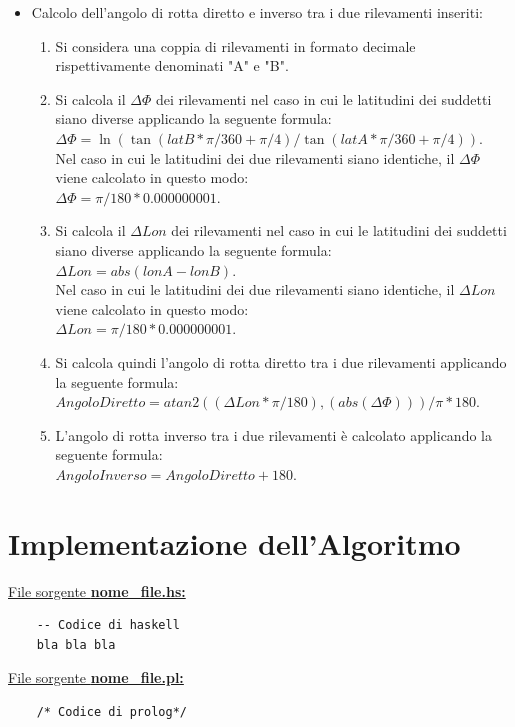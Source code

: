 \documentclass{article}
\begin{document}
\begin{itemize}
	\item  Calcolo dell'angolo di rotta diretto e inverso tra i due rilevamenti inseriti:
	\begin{enumerate}
		\item  Si considera una coppia di rilevamenti in formato decimale rispettivamente denominati "A" e "B".
		\item Si calcola il $\Delta\Phi$ dei rilevamenti nel caso in cui le latitudini dei suddetti siano diverse applicando la seguente formula:\\ $\Delta\Phi = \ln( \tan(latB * \pi / 360 + \pi / 4 ) / \tan(latA * \pi / 360 + \pi / 4 )). $\\
		Nel caso in cui le latitudini dei due rilevamenti siano identiche, il $\Delta\Phi$ viene calcolato in questo modo:\\ $\Delta\Phi = \pi / 180 * 0.000000001.$
		\item Si calcola il $\Delta Lon$ dei rilevamenti nel caso in cui le latitudini dei suddetti siano diverse applicando la seguente formula:\\ $ \Delta Lon = abs(lonA - lonB). $\\
		Nel caso in cui le latitudini dei due rilevamenti siano identiche, il $\Delta Lon$ viene calcolato in questo modo:\\ $\Delta Lon = \pi / 180 * 0.000000001.$
		\item Si calcola quindi l'angolo di rotta diretto tra i due rilevamenti applicando la seguente formula:\\ $ Angolo Diretto = atan2((\Delta Lon * \pi / 180), (abs(\Delta\Phi))) / \pi * 180.$\\
		\item L'angolo di rotta inverso tra i due rilevamenti è calcolato applicando la seguente formula: \\ $ Angolo Inverso = Angolo Diretto+ 180.$\\
	\end{enumerate}

\end{itemize}
\newpage

\section{Implementazione dell'Algoritmo}
\raggedright
\underline{File sorgente \textbf{nome\_file.hs:}}
\lstset{language=Haskell}
\begin{lstlisting}
	-- Codice di haskell
	bla bla bla
\end{lstlisting}
\newpage
\raggedright
\underline{File sorgente \textbf{nome\_file.pl:}}
\lstset{language=Prolog}
\begin{lstlisting}
	/* Codice di prolog*/
\end{lstlisting}
\newpage
\end{document}
